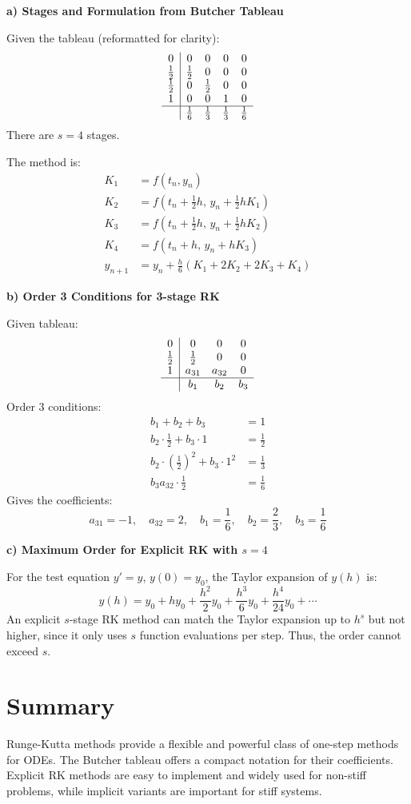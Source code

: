 \textbf{a) Stages and Formulation from Butcher Tableau}

Given the tableau (reformatted for clarity):
\[
\begin{array}{c|cccc}
0   & 0   & 0   & 0   & 0   \\
\frac{1}{2} & \frac{1}{2} & 0   & 0   & 0   \\
\frac{1}{2} & 0   & \frac{1}{2} & 0   & 0   \\
1   & 0   & 0   & 1   & 0   \\
\hline
  & \frac{1}{6} & \frac{1}{3} & \frac{1}{3} & \frac{1}{6}
\end{array}
\]
There are $s=4$ stages.

The method is:
\begin{align*}
K_1 &= f(t_n, y_n) \\
K_2 &= f\left(t_n + \frac{1}{2}h,\, y_n + \frac{1}{2}h K_1\right) \\
K_3 &= f\left(t_n + \frac{1}{2}h,\, y_n + \frac{1}{2}h K_2\right) \\
K_4 &= f\left(t_n + h,\, y_n + h K_3\right) \\
y_{n+1} &= y_n + \frac{h}{6}(K_1 + 2K_2 + 2K_3 + K_4)
\end{align*}

\textbf{b) Order 3 Conditions for 3-stage RK}

Given tableau:
\[
\begin{array}{c|ccc}
0 & 0 & 0 & 0 \\
\frac{1}{2} & \frac{1}{2} & 0 & 0 \\
1 & a_{31} & a_{32} & 0 \\
\hline
  & b_1 & b_2 & b_3
\end{array}
\]
Order 3 conditions:
\begin{align*}
b_1 + b_2 + b_3 &= 1 \\
b_2 \cdot \frac{1}{2} + b_3 \cdot 1 &= \frac{1}{2} \\
b_2 \cdot \left(\frac{1}{2}\right)^2 + b_3 \cdot 1^2 &= \frac{1}{3} \\
b_3 a_{32} \cdot \frac{1}{2} &= \frac{1}{6}
\end{align*}
Gives the coefficients:
\[
a_{31} = -1,\quad a_{32} = 2,\quad b_1 = \frac{1}{6},\quad b_2 = \frac{2}{3},\quad b_3 = \frac{1}{6}
\]

\textbf{c) Maximum Order for Explicit RK with $s=4$}

For the test equation $y' = y$, $y(0) = y_0$, the Taylor expansion of $y(h)$ is:
\[
y(h) = y_0 + h y_0 + \frac{h^2}{2} y_0 + \frac{h^3}{6} y_0 + \frac{h^4}{24} y_0 + \cdots
\]
An explicit $s$-stage RK method can match the Taylor expansion up to $h^s$ but not higher, since it only uses $s$ function evaluations per step. Thus, the order cannot exceed $s$.

\section{Summary}
Runge-Kutta methods provide a flexible and powerful class of one-step methods for ODEs. The Butcher tableau offers a compact notation for their coefficients. Explicit RK methods are easy to implement and widely used for non-stiff problems, while implicit variants are important for stiff systems.
